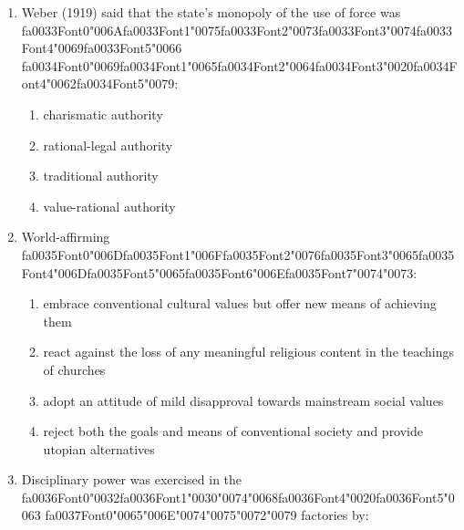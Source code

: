 \documentclass[12pt]{article}
\begin{document}
\begin{enumerate}[label=\arabic*.]
\begin{enumerate}[label=(\alph*)]
    \item all of the above
\end{enumerate}
\item Weber (1919) said that the state's monopoly of the use of force was {\csname fa0033Font0\endcsname\char"006A}{\csname fa0033Font1\endcsname\char"0075}{\csname fa0033Font2\endcsname\char"0073}{\csname fa0033Font3\endcsname\char"0074}{\csname fa0033Font4\endcsname\char"0069}{\csname fa0033Font5\endcsname\char"0066} {\csname fa0034Font0\endcsname\char"0069}{\csname fa0034Font1\endcsname\char"0065}{\csname fa0034Font2\endcsname\char"0064}{\csname fa0034Font3\endcsname\char"0020}{\csname fa0034Font4\endcsname\char"0062}{\csname fa0034Font5\endcsname\char"0079}:
\begin{enumerate}[label=(\alph*)]
    \item charismatic authority
    \item rational-legal authority
    \item traditional authority
    \item value-rational authority
\end{enumerate}
\item World-affirming {\csname fa0035Font0\endcsname\char"006D}{\csname fa0035Font1\endcsname\char"006F}{\csname fa0035Font2\endcsname\char"0076}{\csname fa0035Font3\endcsname\char"0065}{\csname fa0035Font4\endcsname\char"006D}{\csname fa0035Font5\endcsname\char"0065}{\csname fa0035Font6\endcsname\char"006E}{\csname fa0035Font7\endcsname\char"0074}{\char"0073}:
\begin{enumerate}[label=(\alph*)]
    \item embrace conventional cultural values but offer new means of achieving them
    \item react against the loss of any meaningful religious content in the teachings of churches
    \item adopt an attitude of mild disapproval towards mainstream social values
    \item reject both the goals and means of conventional society and provide utopian alternatives
\end{enumerate}
\item Disciplinary power was exercised in the {\csname fa0036Font0\endcsname\char"0032}{\csname fa0036Font1\endcsname\char"0030}{\char"0074}{\char"0068}{\csname fa0036Font4\endcsname\char"0020}{\csname fa0036Font5\endcsname\char"0063} {\csname fa0037Font0\endcsname\char"0065}{\char"006E}{\char"0074}{\char"0075}{\char"0072}{\char"0079} factories by:

\end{enumerate}
\end{document}
